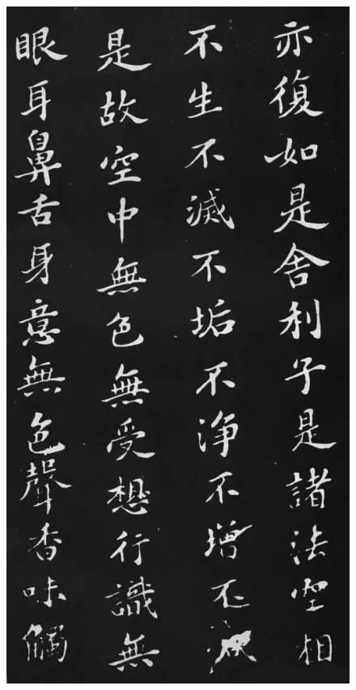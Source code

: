 \documentclass[a4paper,twoside]{article}
\begin{document}
\begin{figure}[ht]
\centering
\includegraphics[width=12.2cm]{images/sushi-2}
\end{figure}
\end{document}
